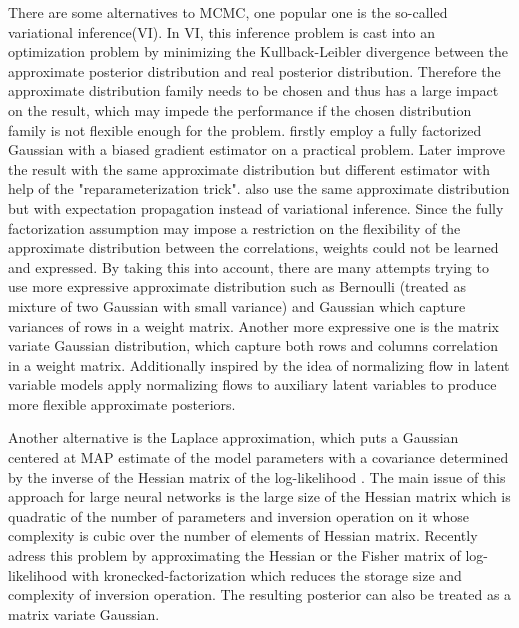 There are some alternatives to MCMC, one popular one is the so-called variational inference(VI)\cite{hinton1993keeping}. In VI, this inference problem is cast into an optimization problem by minimizing the Kullback-Leibler divergence between the approximate posterior distribution and real posterior distribution. Therefore the approximate distribution family needs to be chosen and thus has a large impact on the result, which may impede the performance if the chosen distribution family is not flexible enough for the problem. \cite{graves2011practical} firstly employ a fully factorized Gaussian with a biased gradient estimator on a practical problem. Later \cite{blundell2015weight} improve the result with the same approximate distribution but different estimator with help of the "reparameterization trick"\cite{kingma2013auto}. \citealp{hernandez2015probabilistic} also use the same approximate distribution but with expectation propagation\cite{minka2001expectation} instead of variational inference.
Since the fully factorization assumption may impose a restriction on the flexibility of the approximate distribution between the correlations, weights could not be learned and expressed. By taking this into account, there are many attempts trying to use more expressive approximate distribution such as Bernoulli (treated as mixture of two Gaussian with small variance)\cite{gal2016dropout} and Gaussian \cite{kingma2015variational} which capture variances of rows in a weight matrix. Another more expressive one is the matrix variate Gaussian distribution\cite{louizos2016structured}\cite{sun2017learning}\cite{zhang2017noisy}, which capture both rows and columns correlation in a weight matrix. Additionally inspired by the idea of normalizing flow in latent variable models \cite{louizos2017multiplicative}apply normalizing
flows to auxiliary latent variables to produce more
flexible approximate posteriors. 


Another alternative is the Laplace approximation\cite{mackay1992practical}, which puts a Gaussian centered at MAP estimate of the model parameters with a covariance determined by the inverse of the Hessian matrix of the log-likelihood . The main issue of this approach for large neural networks is the large size of the Hessian matrix which is quadratic of the number of parameters and inversion operation on it whose complexity is cubic over the number of elements of Hessian matrix. Recently \cite{ritter2018scalable} adress this problem by approximating the Hessian or the Fisher matrix of log-likelihood with kronecked-factorization which reduces the storage size and complexity of inversion operation. The resulting posterior can also be treated as a matrix variate Gaussian.  

